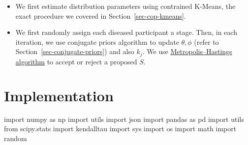 \documentclass[
  letterpaper,
  DIV=11,
  numbers=noendperiod]{scrreprt}
\newenvironment{Shaded}{\begin{snugshade}}{\end{snugshade}}
\newcommand{\ImportTok}[1]{\textcolor[rgb]{0.00,0.46,0.62}{#1}}
\newcommand{\NormalTok}[1]{\textcolor[rgb]{0.00,0.23,0.31}{#1}}
\providecommand{\tightlist}{%
  \setlength{\itemsep}{0pt}\setlength{\parskip}{0pt}}\usepackage{longtable,booktabs,array}
\begin{document}
\begin{itemize}
\tightlist
\item
  We first estimate distribution parameters using contrained K-Means,
  the exact procedure we covered in Section~\ref{sec-cop-kmeans}.
\item
  We first randomly assign each diseased participant a stage. Then, in
  each iteration, we use conjugate priors algorithm to update
  \(\theta, \phi\) (refer to Section~\ref{sec-conjugate-priors}) and
  also \(k_j\). We use
  \href{https://en.wikipedia.org/wiki/Metropolis\%E2\%80\%93Hastings_algorithm}{Metropolis--Hastings
  algorithm} to accept or reject a proposed \(S\).
\end{itemize}

\section{Implementation}\label{implementation-3}

\begin{Shaded}
\begin{Highlighting}[]
\ImportTok{import}\NormalTok{ numpy }\ImportTok{as}\NormalTok{ np }
\ImportTok{import}\NormalTok{ utils }
\ImportTok{import}\NormalTok{ json }
\ImportTok{import}\NormalTok{ pandas }\ImportTok{as}\NormalTok{ pd }
\ImportTok{import}\NormalTok{ utils }
\ImportTok{from}\NormalTok{ scipy.stats }\ImportTok{import}\NormalTok{ kendalltau}
\ImportTok{import}\NormalTok{ sys}
\ImportTok{import}\NormalTok{ os}
\ImportTok{import}\NormalTok{ math }
\ImportTok{import}\NormalTok{ random }
\end{Highlighting}
\end{Shaded}
\end{document}
